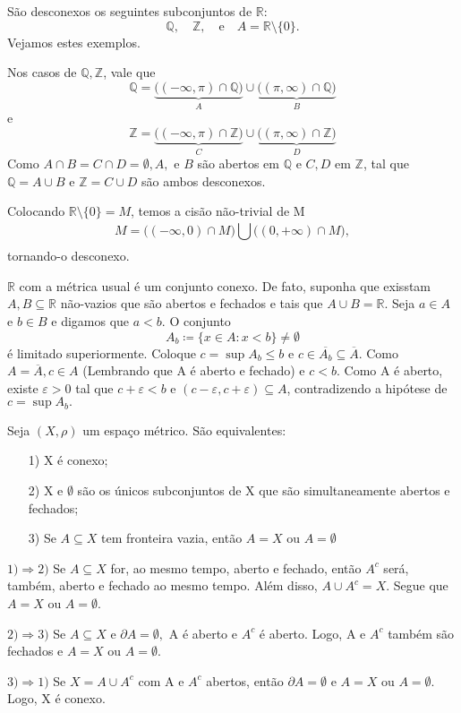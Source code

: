 \documentclass[MetricSpaces/metric_notes.tex]{subfiles}
\begin{document}
\begin{example}
	São desconexos os seguintes subconjuntos de \(\mathbb{R}\):
	\[
		\mathbb{Q}, \quad \mathbb{Z},\quad\text{e}\quad A = \mathbb{R}\setminus\{0\}.
	\]
	Vejamos estes exemplos.

	Nos casos de \(\mathbb{Q}, \mathbb{Z}\), vale que
	\[
		\mathbb{Q} = \underbrace{\biggl((-\infty, \pi )\cap \mathbb{Q}\biggr)}_{A}\cup \underbrace{\biggl((\pi , \infty)\cap \mathbb{Q}\biggr)}_{B}
	\]
	e
	\[
		\mathbb{Z} = \underbrace{\biggl((-\infty, \pi )\cap \mathbb{Z}\biggr)}_{C}\cup \underbrace{\biggl((\pi , \infty)\cap \mathbb{Z}\biggr)}_{D}
	\]
	Como \(A\cap B = C\cap D = \emptyset, A,\text{ e }B\) são abertos em \(\mathbb{Q}\) e \(C, D\) em \(\mathbb{Z}\), tal que \(\mathbb{Q} = A\cup B\)
	e \(\mathbb{Z} = C\cup D\) são ambos desconexos.

	Colocando \(\mathbb{R}\setminus\{0\} = M\), temos a cisão não-trivial de M
	\[
		M = \biggl((-\infty, 0)\cap M\biggr)\bigcup_{}^{}{\biggl((0, +\infty)\cap M\biggr)},
	\]
	tornando-o desconexo.

\end{example}
\begin{example}
	\(\mathbb{R}\) com a métrica usual é um conjunto conexo. De fato, suponha que exisstam
	\(A, B\subseteq{\mathbb{R}}\) não-vazios que são abertos e fechados e tais que \(A\cup B = \mathbb{R}\).
	Seja \(a\in A\) e \(b\in B\) e digamos que \(a < b\). O conjunto
	\[
		A_{b}\coloneqq \{x\in A: x < b\}\neq\emptyset
	\]
	é limitado superiormente. Coloque \(c = \sup A_{b}\leq b\) e \(c\in \overline{A_{b}}\subseteq{\overline{A}}.\)
	Como \(A = \overline{A}, c\in A\) (Lembrando que A é aberto e fechado) e \(c < b\). Como A é
	aberto, existe \(\varepsilon >0\) tal que \(c+\varepsilon < b\) e \((c-\varepsilon , c + \varepsilon )\subseteq{A}\),
	contradizendo a hipótese de \(c = \sup A_{b}.\)
\end{example}
\begin{prop*}
	Seja \((X, \rho )\) um espaço métrico. São equivalentes:
	\begin{itemize}
		\item[1)] X é conexo;
		\item[2)] X e \(\emptyset\) são os únicos subconjuntos de X que são simultaneamente
		      abertos e fechados;
		\item[3)] Se \(A\subseteq X\) tem fronteira vazia, então \(A = X\) ou \(A = \emptyset\)
	\end{itemize}
\end{prop*}
\begin{proof*}
	\(1) \Rightarrow 2)\) Se \(A \subseteq{X}\) for, ao mesmo tempo, aberto e fechado,
	então \(A^{c}\) será, também, aberto e fechado ao mesmo tempo. Além disso, \(A\cup A^{c} = X\).
	Segue que \(A = X\) ou \(A = \emptyset.\)

	\(2) \Rightarrow 3)\) Se \(A\subseteq{X}\) e \(\partial A = \emptyset,\) A é aberto e \(A^{c}\) é
	aberto. Logo, A e \(A^{c}\) também são fechados e \(A=X\) ou \(A=\emptyset\).

	\(3) \Rightarrow 1)\) Se \(X = A\cup A^{c}\) com A e \(A^{c}\) abertos, então \(\partial A = \emptyset\) e \(A = X\)
	ou \(A = \emptyset.\) Logo, X é conexo. \qedsymbol
\end{proof*}
\end{document}
